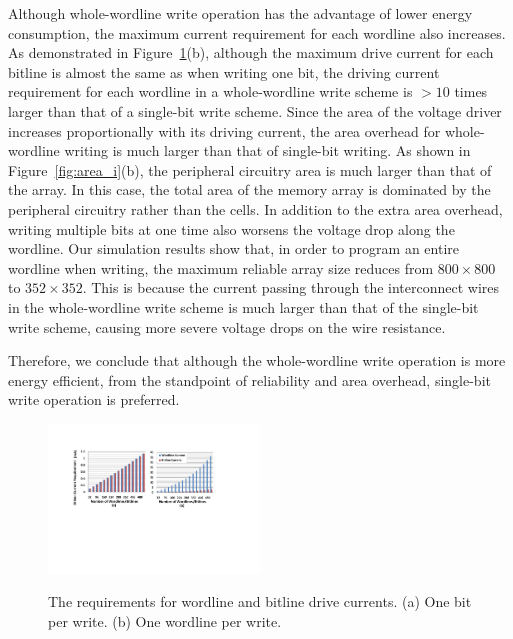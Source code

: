 Although whole-wordline write operation has the advantage of lower energy
consumption, the maximum current requirement for each wordline also
increases. As demonstrated in Figure~\ref{fig:drive_i}(b), although the
maximum drive current for each bitline is almost the same as when writing
one bit, the driving current requirement for each wordline in a
whole-wordline  write scheme is $>10$ times larger than that of a
single-bit write scheme. Since the area of the voltage driver increases
proportionally with its driving current, the area overhead for
whole-wordline writing is much larger than that of single-bit writing. As
shown in Figure~\ref{fig:area_i}(b), the peripheral circuitry area is much
larger than that of the array. In this case, the total area of the memory
array is dominated by the peripheral circuitry rather than the cells. In
addition to the extra area overhead, writing multiple bits at one time
also worsens the voltage drop along the wordline. Our simulation results
show that, in order to program an entire wordline when writing, the
maximum reliable array size reduces from $800 \times 800$ to $352 \times
352$. This is because the current passing through the interconnect wires
in the whole-wordline write scheme is much larger than that of the
single-bit write scheme, causing more severe voltage drops on the wire
resistance.

Therefore, we conclude that although the whole-wordline write operation is
more energy efficient, from the standpoint of reliability and area
overhead, single-bit write operation is preferred.
\begin{figure}%
\centering
  \includegraphics[width=0.5\textwidth]{./figures/drive_i_f.pdf}\\
  \caption{The requirements for wordline and bitline drive currents. (a) One bit per write. (b) One wordline per write.}\label{fig:drive_i}
  \vspace{-10pt}
\end{figure}



